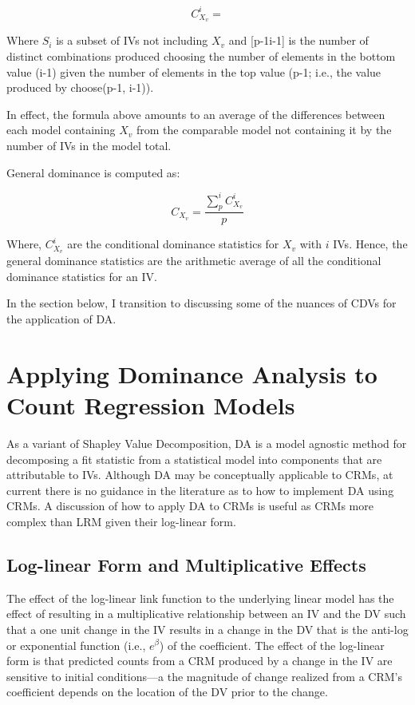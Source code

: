 \documentclass[ShortAfour,times,sageapa]{sagej}
\begin{document}
	\begin{equation}
		C^{i}_{X_v} =
	\end{equation}
	
	Where $S_i$ is a subset of IVs not including $X_v$ and [p-1i-1] is the number of distinct combinations produced choosing the number of elements in the bottom value (i-1) given the number of elements in the top value (p-1; i.e., the value produced by choose(p-1, i-1)).
	
	In effect, the formula above amounts to an average of the differences between each model containing $X_v$ from the comparable model not containing it by the number of IVs in the model total.
	
	General dominance is computed as:
	
	\begin{equation}
		C_{X_v} = \frac{\sum_{p}^{i} C^{i}_{X_v}}{p}
	\end{equation}
	
	Where, $C^{i}_{X_v}$ are the conditional dominance statistics for $X_v$ with $i$ IVs. 
	Hence, the general dominance statistics are the arithmetic average of all the conditional dominance statistics for an IV.
	
	In the section below, I transition to discussing some of the nuances of CDVs for the application of DA.
	
\section{Applying Dominance Analysis to Count Regression Models}

	As a variant of Shapley Value Decomposition, DA is a model agnostic method for decomposing a fit statistic from a statistical model into components that are attributable to IVs.
	Although DA may be conceptually applicable to CRMs, at current there is no guidance in the literature as to how to implement DA using CRMs.
	A discussion of how to apply DA to CRMs is useful as CRMs more complex than LRM given their log-linear form.  
	
	\subsection{Log-linear Form and Multiplicative Effects}
	
	The effect of the log-linear link function to the underlying linear model has the effect of resulting in a multiplicative relationship between an IV and the DV %
	such that a one unit change in the IV results in a change in the DV that is the anti-log or exponential function (i.e., $e^{\beta}$) of the coefficient.  
	The effect of the log-linear form is that predicted counts from a CRM produced by a change in the IV are sensitive to initial conditions---a the magnitude of change realized from a CRM's coefficient depends on the location of the DV prior to the change.  
	
\end{document}

